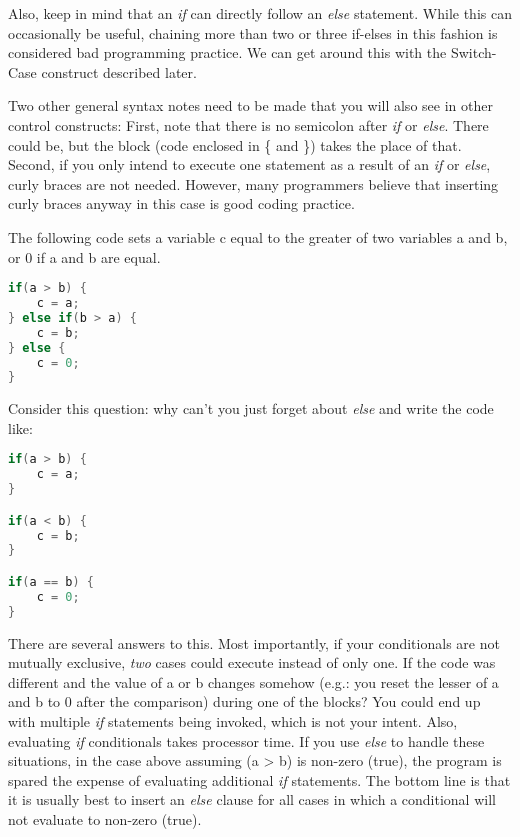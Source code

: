 Also, keep in mind that an \emph{if} can directly follow an \emph{else}
statement. While this can occasionally be useful, chaining more than two or
three if-elses in this fashion is considered bad programming practice. We can
get around this with the Switch-Case construct described later.

Two other general syntax notes need to be made that you will also see in other
control constructs: First, note that there is no semicolon after \emph{if} or
\emph{else}. There could be, but the block (code enclosed in \{ and \}) takes
the place of that. Second, if you only intend to execute one statement as a
result of an \emph{if} or \emph{else}, curly braces are not needed. However,
many programmers believe that inserting curly braces anyway in this case is
good coding practice.

The following code sets a variable c equal to the greater of two variables a
and b, or 0 if a and b are equal.
\lstset{basicstyle=\scriptsize, numbers=left, captionpos=b, tabsize=4}
\begin{lstlisting}[caption=Section \thesection listing \arabic{controlcnt},language={C},
breaklines=true,xleftmargin=15pt, label=lst:section\thesection listing\arabic{controlcnt}]
if(a > b) {
	c = a;
} else if(b > a) {
	c = b;
} else {
	c = 0;
}
\end{lstlisting} 

Consider this question: why can't you just forget about \emph{else} and write
the code like:

\lstset{basicstyle=\scriptsize, numbers=left, captionpos=b, tabsize=4}
\begin{lstlisting}[caption=Section \thesection listing \arabic{controlcnt},language={C},
breaklines=true,xleftmargin=15pt, label=lst:section\thesection listing\arabic{controlcnt}]
if(a > b) {
	c = a;
}

if(a < b) {
	c = b;
}

if(a == b) {
	c = 0;
}
\end{lstlisting}

There are several answers to this. Most importantly, if your conditionals are
not mutually exclusive, \emph{two} cases could execute instead of only one. If
the code was different and the value of a or b changes somehow (e.g.: you reset
the lesser of a and b to 0 after the comparison) during one of the blocks? You
could end up with multiple \emph{if} statements being invoked, which is not
your intent. Also, evaluating \emph{if} conditionals takes processor time. If
you use \emph{else} to handle these situations, in the case above assuming (a
\textgreater{} b) is non-zero (true), the program is spared the expense of
evaluating additional \emph{if} statements. The bottom line is that it is
usually best to insert an \emph{else} clause for all cases in which a
conditional will not evaluate to non-zero (true).

